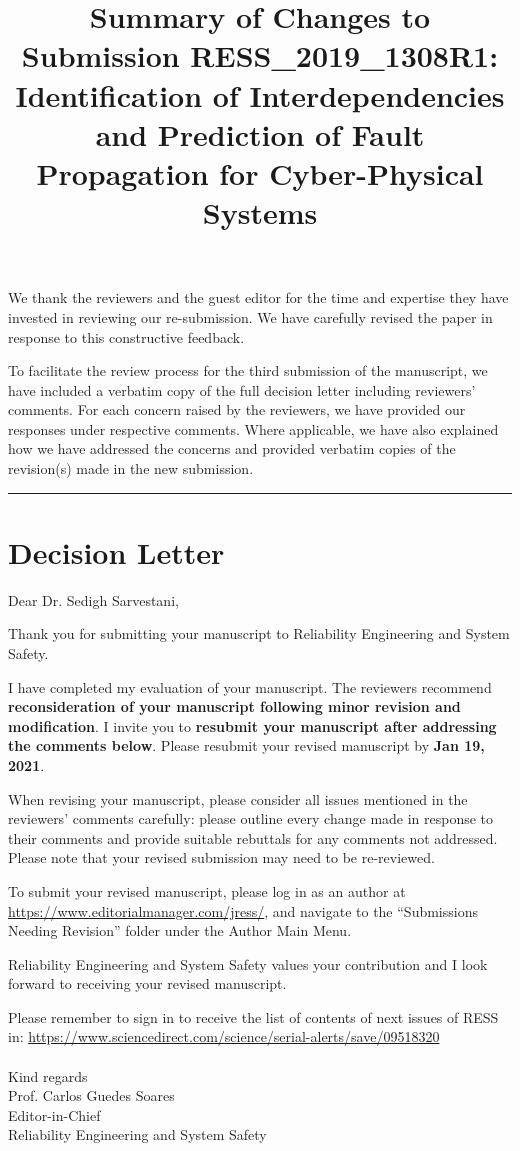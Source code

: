 \documentclass{article}
\title{Summary of Changes to Submission RESS\_2019\_1308R1: \\
Identification of Interdependencies and Prediction of Fault Propagation for Cyber-Physical Systems}
\date{}
\begin{document}
\maketitle
\noindent
We thank the reviewers and the guest editor for the time and expertise they have invested in reviewing our re-submission. We have carefully revised the paper in response to this constructive feedback.

To facilitate the review process for the third submission of the manuscript, we have included a verbatim copy of the full decision letter including reviewers' comments. For each concern raised by the reviewers, we have provided our responses under respective comments. Where applicable, we have also explained how we have addressed the concerns and provided verbatim copies of the revision(s) made in the new submission. \vspace{3em}

\noindent\rule[0.5ex]{\linewidth}{1pt}

\section{Decision Letter}
\label{sec:decision_letter}
Dear Dr. Sedigh Sarvestani,

Thank you for submitting your manuscript to Reliability Engineering and System Safety.

I have completed my evaluation of your manuscript. The reviewers recommend \textbf{reconsideration of your manuscript following minor revision and modification}. I invite you to \textbf{resubmit your manuscript after addressing the comments below}. Please resubmit your revised manuscript by \textbf{Jan 19, 2021}.

When revising your manuscript, please consider all issues mentioned in the reviewers' comments carefully: please outline every change made in response to their comments and provide suitable rebuttals for any comments not addressed. Please note that your revised submission may need to be re-reviewed.

To submit your revised manuscript, please log in as an author at \url{https://www.editorialmanager.com/jress/}, and navigate to the ``Submissions Needing Revision'' folder under the Author Main Menu.

Reliability Engineering and System Safety values your contribution and I look forward to receiving your revised manuscript.

Please remember to sign in to receive the list of contents of next issues of RESS in: \url{https://www.sciencedirect.com/science/serial-alerts/save/09518320} \\ \\
Kind regards \\
Prof. Carlos Guedes Soares \\
Editor-in-Chief \\
Reliability Engineering and System Safety
\end{document}
